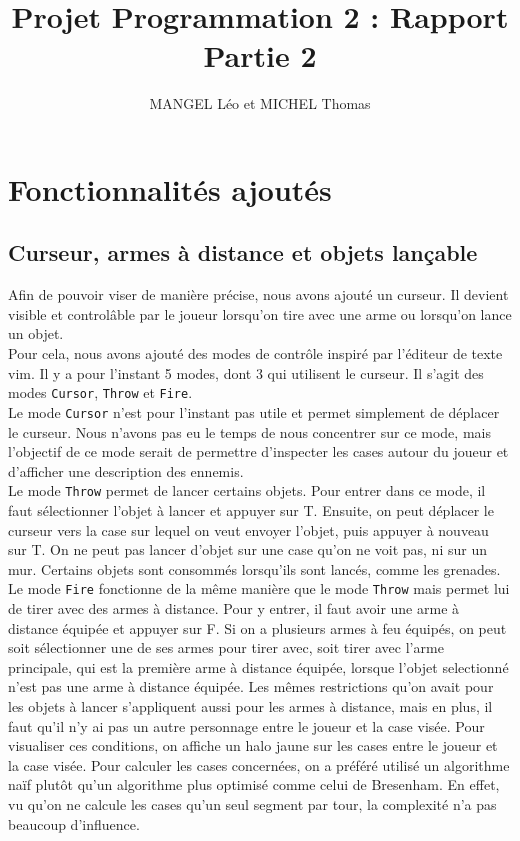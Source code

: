 \documentclass[10pt,a4paper]{article}
\title{Projet Programmation 2 : Rapport Partie 2}
\author{MANGEL Léo et MICHEL Thomas}
\date{}
\begin{document}
\maketitle

\section{Fonctionnalités ajoutés}

\subsection{Curseur, armes à distance et objets lançable}

Afin de pouvoir viser de manière précise, nous avons ajouté un curseur. Il devient visible et control\^able par le joueur lorsqu'on tire avec une arme ou lorsqu'on lance un objet.\\
Pour cela, nous avons ajouté des modes de contr\^ole inspiré par l'éditeur de texte vim. Il y a pour l'instant 5 modes, dont 3 qui utilisent le curseur. Il s'agit des modes \texttt{Cursor}, \texttt{Throw} et \texttt{Fire}.\\
Le mode \texttt{Cursor} n'est pour l'instant pas utile et permet simplement de déplacer le curseur. Nous n'avons pas eu le temps de nous concentrer sur ce mode, mais l'objectif de ce mode serait de permettre d'inspecter les cases autour du joueur et d'afficher une description des ennemis.\\
Le mode \texttt{Throw} permet de lancer certains objets. Pour entrer dans ce mode, il faut sélectionner l'objet à lancer et appuyer sur T. Ensuite, on peut déplacer le curseur vers la case sur lequel on veut envoyer l'objet, puis appuyer à nouveau sur T. On ne peut pas lancer d'objet sur une case qu'on ne voit pas, ni sur un mur. Certains objets sont consommés lorsqu'ils sont lancés, comme les grenades.\\
Le mode \texttt{Fire} fonctionne de la même manière que le mode \texttt{Throw} mais permet lui de tirer avec des armes à distance. Pour y entrer, il faut avoir une arme à distance équipée et appuyer sur F. Si on a plusieurs armes à feu équipés, on peut soit sélectionner une de ses armes pour tirer avec, soit tirer avec l'arme principale, qui est la première arme à distance équipée, lorsque l'objet selectionné n'est pas une arme à distance équipée. Les mêmes restrictions qu'on avait pour les objets à lancer s'appliquent aussi pour les armes à distance, mais en plus, il faut qu'il n'y ai pas un autre personnage entre le joueur et la case visée. Pour visualiser ces conditions, on affiche un halo jaune sur les cases entre le joueur et la case visée. Pour calculer les cases concernées, on a préféré utilisé un algorithme naïf plut\^ot qu'un algorithme plus optimisé comme celui de Bresenham. En effet, vu qu'on ne calcule les cases qu'un seul segment par tour, la complexité n'a pas beaucoup d'influence.\\
\end{document}
